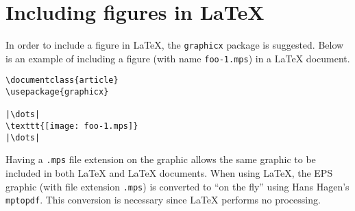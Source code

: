 \section{Including \MP{} figures in \LaTeX}
\label{sec:latexincl}

In order to include a \MP{} figure in \LaTeX{}, the \texttt{graphicx}
package is suggested.  Below is an example of including a \MP{} figure
(with name \texttt{foo-1.mps}) in a \LaTeX{} document.

\begin{lstlisting}[xleftmargin=17bp]
\documentclass{article}
\usepackage{graphicx}

|\dots|
\texttt{[image: foo-1.mps]}
|\dots|

\end{lstlisting}

Having a \verb|.mps| file extension on the graphic allows the same
graphic to be included in both \LaTeX{} and \PDF\LaTeX{} documents.
When using \PDF\LaTeX, the EPS graphic (with file extension \verb|.mps|)
is converted to \PDF{} ``on the fly'' using Hans Hagen's
\texttt{mptopdf}.  This conversion is necessary since \PDF\LaTeX{}
performs no \PS{} processing.
